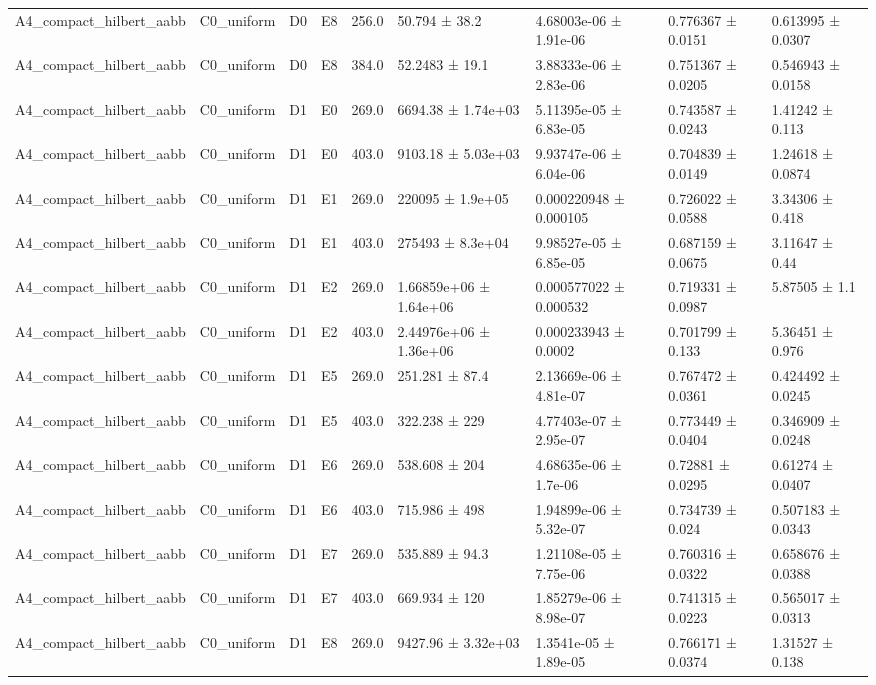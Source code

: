 \begin{table}
\begin{tabular}{lllllllll}
A4\_compact\_hilbert\_aabb & C0\_uniform & D0 & E8 & 256.0 & 50.794 ± 38.2 & 4.68003e-06 ± 1.91e-06 & 0.776367 ± 0.0151 & 0.613995 ± 0.0307 \\
A4\_compact\_hilbert\_aabb & C0\_uniform & D0 & E8 & 384.0 & 52.2483 ± 19.1 & 3.88333e-06 ± 2.83e-06 & 0.751367 ± 0.0205 & 0.546943 ± 0.0158 \\
A4\_compact\_hilbert\_aabb & C0\_uniform & D1 & E0 & 269.0 & 6694.38 ± 1.74e+03 & 5.11395e-05 ± 6.83e-05 & 0.743587 ± 0.0243 & 1.41242 ± 0.113 \\
A4\_compact\_hilbert\_aabb & C0\_uniform & D1 & E0 & 403.0 & 9103.18 ± 5.03e+03 & 9.93747e-06 ± 6.04e-06 & 0.704839 ± 0.0149 & 1.24618 ± 0.0874 \\
A4\_compact\_hilbert\_aabb & C0\_uniform & D1 & E1 & 269.0 & 220095 ± 1.9e+05 & 0.000220948 ± 0.000105 & 0.726022 ± 0.0588 & 3.34306 ± 0.418 \\
A4\_compact\_hilbert\_aabb & C0\_uniform & D1 & E1 & 403.0 & 275493 ± 8.3e+04 & 9.98527e-05 ± 6.85e-05 & 0.687159 ± 0.0675 & 3.11647 ± 0.44 \\
A4\_compact\_hilbert\_aabb & C0\_uniform & D1 & E2 & 269.0 & 1.66859e+06 ± 1.64e+06 & 0.000577022 ± 0.000532 & 0.719331 ± 0.0987 & 5.87505 ± 1.1 \\
A4\_compact\_hilbert\_aabb & C0\_uniform & D1 & E2 & 403.0 & 2.44976e+06 ± 1.36e+06 & 0.000233943 ± 0.0002 & 0.701799 ± 0.133 & 5.36451 ± 0.976 \\
A4\_compact\_hilbert\_aabb & C0\_uniform & D1 & E5 & 269.0 & 251.281 ± 87.4 & 2.13669e-06 ± 4.81e-07 & 0.767472 ± 0.0361 & 0.424492 ± 0.0245 \\
A4\_compact\_hilbert\_aabb & C0\_uniform & D1 & E5 & 403.0 & 322.238 ± 229 & 4.77403e-07 ± 2.95e-07 & 0.773449 ± 0.0404 & 0.346909 ± 0.0248 \\
A4\_compact\_hilbert\_aabb & C0\_uniform & D1 & E6 & 269.0 & 538.608 ± 204 & 4.68635e-06 ± 1.7e-06 & 0.72881 ± 0.0295 & 0.61274 ± 0.0407 \\
A4\_compact\_hilbert\_aabb & C0\_uniform & D1 & E6 & 403.0 & 715.986 ± 498 & 1.94899e-06 ± 5.32e-07 & 0.734739 ± 0.024 & 0.507183 ± 0.0343 \\
A4\_compact\_hilbert\_aabb & C0\_uniform & D1 & E7 & 269.0 & 535.889 ± 94.3 & 1.21108e-05 ± 7.75e-06 & 0.760316 ± 0.0322 & 0.658676 ± 0.0388 \\
A4\_compact\_hilbert\_aabb & C0\_uniform & D1 & E7 & 403.0 & 669.934 ± 120 & 1.85279e-06 ± 8.98e-07 & 0.741315 ± 0.0223 & 0.565017 ± 0.0313 \\
A4\_compact\_hilbert\_aabb & C0\_uniform & D1 & E8 & 269.0 & 9427.96 ± 3.32e+03 & 1.3541e-05 ± 1.89e-05 & 0.766171 ± 0.0374 & 1.31527 ± 0.138 \\

\end{tabular}
\end{table}
